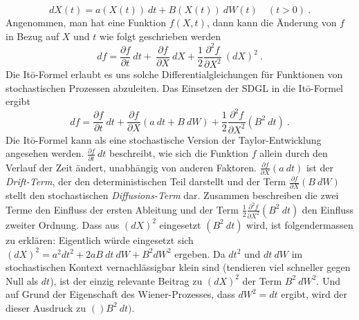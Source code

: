 \begin{equation}
	dX(t) = a(X(t)) \ dt + B(X(t)) \ dW(t) \quad (t>0) \ .
\end{equation}
Angenommen, man hat eine Funktion $ f(X,t) $, dann kann die Änderung von $ f $ in Bezug auf $ X $ und $ t $ wie folgt geschrieben werden
\begin{equation}
	df = \frac{\partial f}{\partial t} \ dt + \ \frac{\partial f}{\partial X} \ dX + \frac{1}{2} \frac{\partial^2 f} {\partial X^2} \ (dX)^2 \ .	
\end{equation}
Die Itō-Formel erlaubt es uns solche Differentialgleichungen für Funktionen von stochastischen Prozessen abzuleiten. Das Einsetzen der SDGL in die Itō-Formel ergibt
\begin{equation}
	df = \frac{\partial f}{\partial t} \ dt + \frac{\partial f}{\partial X} (a \ dt + B \ dW) + \frac{1}{2} \frac{\partial^2 f}{\partial X^2} (B^2 \ dt) \ .
\end{equation}
Die Itō-Formel kann als eine stochastische Version der Taylor-Entwicklung angesehen werden. $ \frac{\partial f}{\partial t} \ dt $ beschreibt, wie sich die Funktion $ f $ allein durch den Verlauf der Zeit ändert, unabhängig von anderen Faktoren. $ \frac{\partial f}{\partial X} (a \ dt) $ ist der \textit{Drift-Term}, der den deterministischen Teil darstellt und der Term $  \frac{\partial f}{\partial X} (B \ dW) $ stellt den stochastischen \textit{Diffusions-Term} dar. Zusammen beschreiben die zwei Terme den Einfluss der ersten Ableitung und der Term $ \frac{1}{2} \frac{\partial^2 f}{\partial X^2} (B^2 \ dt) $ den Einfluss zweiter Ordnung. Dass aus $ (dX)^2 $ eingesetzt $ (B^2 \ dt) $ wird, ist folgendermassen zu erklären:
Eigentlich würde eingesetzt sich $ (dX)^2 = a^2 dt^2 + 2a B \ dt \ dW + B^2 dW^2 $ ergeben. Da $ dt^2 $ und $ dt \ dW $ im stochastischen Kontext vernachlässigbar klein sind (tendieren viel schneller gegen Null als $ dt $), ist der einzig relevante Beitrag zu $ (dX)^2 $ der Term $ B^2 \ dW^2 $. Und auf Grund der Eigenschaft des Wiener-Prozesses, dass $ dW^2 = dt $ ergibt, wird der dieser Ausdruck zu $ ()B^2 \ dt) $.



